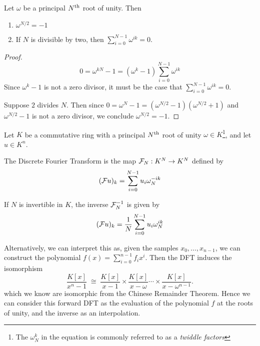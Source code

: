 \begin{lemma}\label{lem:rou-results}
    Let $\omega$ be a principal $N^{\textrm{th}}$ root of unity. Then 
    \begin{enumerate}
        \item $\omega^{N/2} = -1$
        \item If $N$ is divisible by two, then $\sum_{i = 0}^{N-1} \omega^{ik} = 0$.
    \end{enumerate}
\end{lemma}
\begin{proof}
    \[
        0 = \omega^{kN} - 1 = (\omega^k - 1)\sum^{N-1}_{i=0} \omega^{ik}
    \]
    Since $\omega^k - 1$ is not a zero divisor, it must be the case that $\sum^{N-1}_{i=0} \omega^{ik} = 0$.

    Suppose $2$ divides $N$. Then since $0 = \omega^N - 1 = (\omega^{N/2} - 1)(\omega^{N/2} + 1)$ and $\omega^{N/2} - 1$ is not a zero divisor, we conclude $\omega^{N/2} = -1$.
\end{proof}


\begin{definition}
    Let $K$ be a commutative ring with a principal $N^{\textrm{th}}$ root of unity $\omega \in K$\footnote{The $\omega_N^k$ in the equation is commonly referred to as a \textit{twiddle factors}}, and let $u \in K^n$.

    The Discrete Fourier Transform is the map $\mathcal F_N : K^N \to K^N$ defined by
    \begin{equation}\label{eq:forward-dft}
        (\mathcal Fu)_k = \sum^{N-1}_{i=0}u_i\omega_{N}^{-ik}
    \end{equation}

    If $N$ is invertible in $K$, the inverse $\mathcal F_N^{-1}$ is given by
    \begin{equation}\label{eq:reverse-dft}
        (\mathcal Fu)_k = \frac{1}{N}\sum^{N-1}_{i=0}u_i\omega_N^{ik}
    \end{equation}
\end{definition}

Alternatively, we can interpret this as, given the samples $x_0, \ldots, x_{n-1}$, we can construct the polynomial $f(x) = \sum_{i=0}^{n-1} f_i x^i$. Then the DFT induces the isomorphism
\begin{equation}\label{eq:fft-iso}
    \frac{K[x]}{x^n - 1} \; \cong \; \frac{K[x]}{x - 1} \times \frac{K[x]}{x - \omega} \cdots \times \frac{K[x]}{x - \omega^{n-1}}.
\end{equation}
which we know are isomorphic from the Chinese Remainder Theorem.
Hence we can consider this forward DFT as the evaluation of the polynomial $f$ at the roots of unity, and the inverse as an interpolation.

